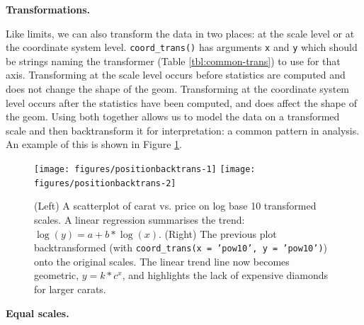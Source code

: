 \textbf{Transformations.}

Like limits, we can also transform the data in two places: at the scale
level or at the coordinate system level. \texttt{coord\_trans()} has
arguments \texttt{x} and \texttt{y} which should be strings naming the
transformer (Table \ref{tbl:common-trans}) to use for that axis.
Transforming at the scale level occurs before statistics are computed
and does not change the shape of the geom. Transforming at the
coordinate system level occurs after the statistics have been computed,
and does affect the shape of the geom. Using both together allows us to
model the data on a transformed scale and then backtransform it for
interpretation: a common pattern in analysis. An example of this is
shown in Figure \ref{fig:backtrans}.
 

\begin{Shaded}
\begin{Highlighting}[]
\StringTok{ }\NormalTok{(}\NormalTok{)}
  \NormalTok{) +}\StringTok{ }
\StringTok{  }\NormalTok{(} \NormalTok{)}
\NormalTok{() +}\StringTok{ }\NormalTok{(}  
\end{Highlighting}
\end{Shaded}

\begin{figure}

{\centering \texttt{[image: figures/positionbacktrans-1]} \texttt{[image: figures/positionbacktrans-2]} 

}

\caption{(Left) A scatterplot of carat vs. price on log base 10 transformed scales.  A linear regression summarises the trend: $\log(y) = a + b * \log(x)$.  (Right) The previous plot backtransformed (with \texttt{coord\_trans(x = 'pow10', y = 'pow10')}) onto the original scales.  The linear trend line now becomes geometric, $y = k * c^x$, and highlights the lack of expensive diamonds for larger carats.\label{fig:backtrans}}
\end{figure}

\textbf{Equal scales.}

